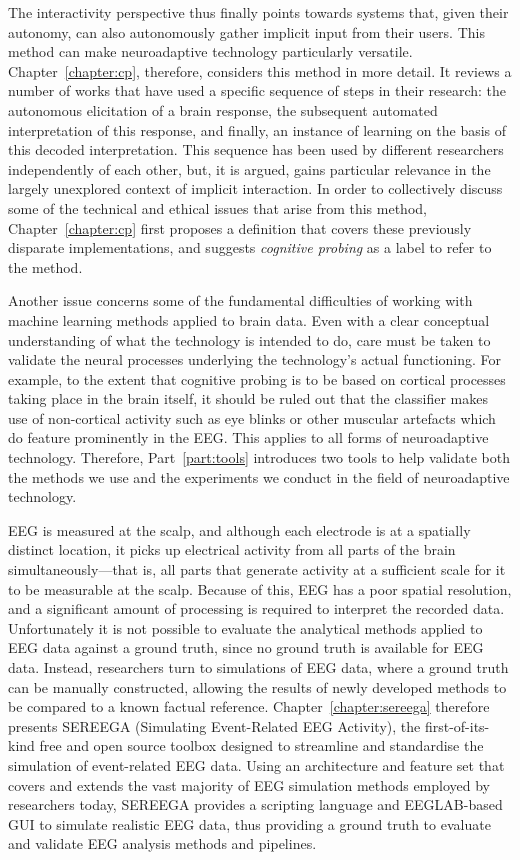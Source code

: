 The interactivity perspective thus finally points towards systems that, given their autonomy, can also autonomously gather implicit input from their users. This method can make neuroadaptive technology particularly versatile. Chapter~\ref{chapter:cp}, therefore, considers this method in more detail. It reviews a number of works that have used a specific sequence of steps in their research: the autonomous elicitation of a brain response, the subsequent automated interpretation of this response, and finally, an instance of learning on the basis of this decoded interpretation. This sequence has been used by different researchers independently of each other, but, it is argued, gains particular relevance in the largely unexplored context of implicit interaction. In order to collectively discuss some of the technical and ethical issues that arise from this method, Chapter~\ref{chapter:cp} first proposes a definition that covers these previously disparate implementations, and suggests \emph{cognitive probing} as a label to refer to the method. 

Another issue concerns some of the fundamental difficulties of working with machine learning methods applied to brain data. Even with a clear conceptual understanding of what the technology is intended to do, care must be taken to validate the neural processes underlying the technology's actual functioning. For example, to the extent that cognitive probing is to be based on cortical processes taking place in the brain itself, it should be ruled out that the classifier makes use of non-cortical activity such as eye blinks or other muscular artefacts which do feature prominently in the EEG. This applies to all forms of neuroadaptive technology. Therefore, Part~\ref{part:tools} introduces two tools to help validate both the methods we use and the experiments we conduct in the field of neuroadaptive technology.

EEG is measured at the scalp, and although each electrode is at a spatially distinct location, it picks up electrical activity from all parts of the brain simultaneously---that is, all parts that generate activity at a sufficient scale for it to be measurable at the scalp. Because of this, EEG has a poor spatial resolution, and a significant amount of processing is required to interpret the recorded data. Unfortunately it is not possible to evaluate the analytical methods applied to EEG data against a ground truth, since no ground truth is available for EEG data. Instead, researchers turn to simulations of EEG data, where a ground truth can be manually constructed, allowing the results of newly developed methods to be compared to a known factual reference. Chapter~\ref{chapter:sereega} therefore presents SEREEGA (Simulating Event-Related EEG Activity), the first-of-its-kind free and open source toolbox designed to streamline and standardise the simulation of event-related EEG data. Using an architecture and feature set that covers and extends the vast majority of EEG simulation methods employed by researchers today, SEREEGA provides a scripting language and EEGLAB-based GUI \cite{delorme2004eeglab} to simulate realistic EEG data, thus providing a ground truth to evaluate and validate EEG analysis methods and pipelines.


